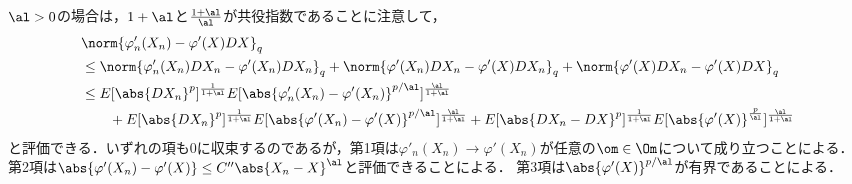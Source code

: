 \documentclass[uplatex,dvipdfmx]{jsreport}
\begin{document}
\begin{Proof}
\begin{enumerate}
\begin{enumerate}[{Step}1]
\begin{Proof}[【証】]
                $\al>0$の場合は，$1+\al$と$\frac{1+\al}{\al}$が共役指数であることに注意して，
                \begin{align*}
                    &\norm{\varphi'_n(X_n)-\varphi'(X)DX}_{q}\\
                    &\le\norm{\varphi'_n(X_n)DX_n-\varphi'(X_n)DX_n}_q+\norm{\varphi'(X_n)DX_n-\varphi'(X)DX_n}_q+\norm{\varphi'(X)DX_n-\varphi'(X)DX}_q\\
                    &\le E[\abs{DX_n}^p]^{\frac{1}{1+\al}}E[\abs{\varphi'_n(X_n)-\varphi'(X_n)}^{p/\al}]^{\frac{\al}{1+\al}}\\
                    &\qquad+E[\abs{DX_n}^p]^{\frac{1}{1+\al}}E[\abs{\varphi'(X_n)-\varphi'(X)}^{p/\al}]^{\frac{\al}{1+\al}}+E[\abs{DX_n-DX}^p]^{\frac{1}{1+\al}}E[\abs{\varphi'(X)}^{\frac{p}{\al}}]^{\frac{\al}{1+\al}}
                \end{align*}
                と評価できる．いずれの項も$0$に収束するのであるが，第1項は$\varphi'_n(X_n)\to\varphi'(X_n)$が任意の$\om\in\Om$について成り立つことによる．
                第2項は$\abs{\varphi'(X_n)-\varphi'(X)}\le C''\abs{X_n-X}^\al$と評価できることによる．
                第3項は$\abs{\varphi'(X)}^{p/\al}$が有界であることによる．
            \end{Proof}
        \end{enumerate}
    \end{enumerate}
\end{Proof}
\end{document}
